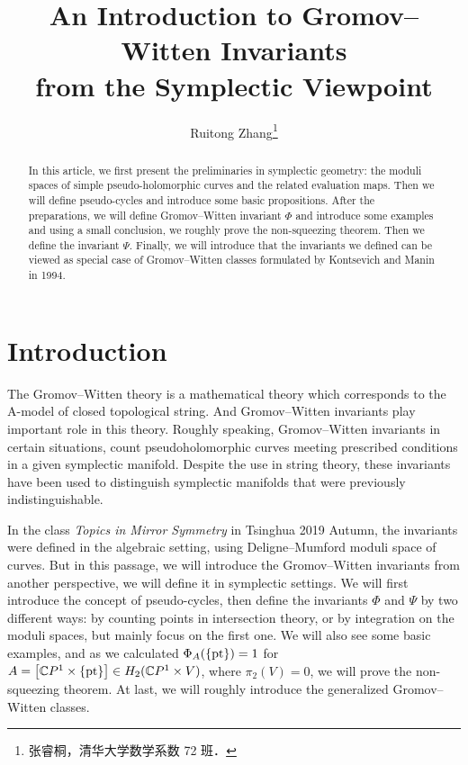 \documentclass[twoside]{article}
\begin{document}
\title{An Introduction to Gromov--Witten Invariants\\from the Symplectic Viewpoint}
\author{Ruitong Zhang\footnote{张睿桐，清华大学数学系数 72 班．}}

\begin{abstract}
    In this article, we first present the preliminaries in symplectic geometry: 
    the moduli spaces of simple pseudo-holomorphic curves and the related evaluation maps. 
    Then we will define pseudo-cycles and introduce some basic propositions. 
    After the preparations, we will define Gromov--Witten invariant $\Phi$ 
    and introduce some examples and using a small conclusion, 
    we roughly prove the non-squeezing theorem. 
    Then we define the invariant $\Psi$. Finally, 
    we will introduce that the invariants we defined can be viewed 
    as special case of Gromov--Witten classes formulated by Kontsevich and Manin in 1994.
\end{abstract}

\section{Introduction}
The Gromov--Witten theory is a mathematical theory which corresponds to 
the A-model of closed topological string. 
And Gromov--Witten invariants play important role in this theory. 
Roughly speaking, Gromov--Witten invariants in certain situations, 
count pseudoholomorphic curves meeting prescribed conditions in a given symplectic manifold. 
Despite the use in string theory, 
these invariants have been used to distinguish symplectic manifolds that were previously indistinguishable.

In the class \emph{Topics in Mirror Symmetry} in Tsinghua 2019 Autumn, 
the invariants were defined in the algebraic setting, 
using Deligne--Mumford moduli space of curves. 
But in this passage, we will introduce the Gromov--Witten invariants from another perspective, 
we will define it in symplectic settings. 
We will first introduce the concept of pseudo-cycles, 
then define the invariants $\Phi$ and $\Psi$ by two different ways: 
by counting points in intersection theory, 
or by integration on the moduli spaces, but mainly focus on the first one. 
We will also see some basic examples, and as we calculated $\Phi_A(\{\operatorname{pt}\})=1$ 
for $A=\left[\mathbb{C}P^{1}\times\{\operatorname{pt}\} \right]\in H_2(\mathbb{C}P^{1}\times V)$, 
where $\pi_2(V)=0$, we will prove the non-squeezing theorem. 
At last, we will roughly introduce the generalized Gromov--Witten classes.
\end{document}

